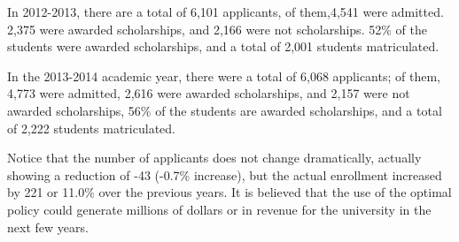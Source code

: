 \documentclass[12pt,english]{report}
\begin{document}
In 2012-2013, there are a total of 6,101 applicants, of them,4,541   were admitted. 2,375 were awarded scholarships, and 2,166 were not scholarships. 52\% of the students were awarded scholarships, and a total of 2,001 students matriculated.

In the 2013-2014 academic year, there were a total of 6,068 applicants; of them, 4,773 were admitted, 2,616 were awarded scholarships, and 2,157 were not awarded scholarships, 56\% of the students are awarded scholarships, and a total of 2,222 students matriculated.

Notice that the number of applicants does not change dramatically, actually showing a reduction of -43 (-0.7\% increase), but the actual enrollment increased by 221  or 11.0\% over the previous years.  It is believed that the use of the optimal policy could generate millions of dollars or in revenue for the university in the next few years.

\end{document}
